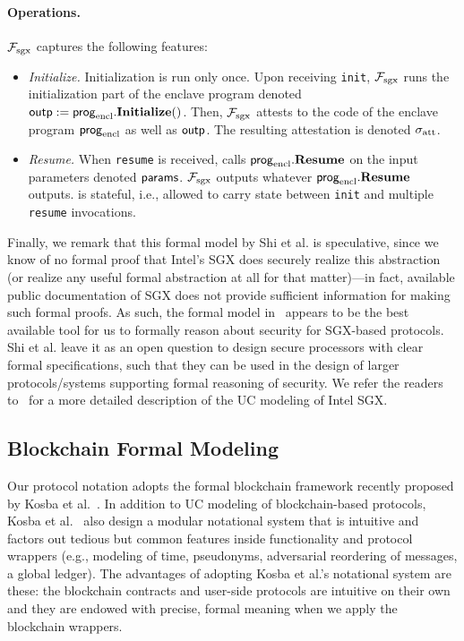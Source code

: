 \paragraph{Operations.}
$\mathcal{F}_{\textrm{sgx}}$ captures the following features:
\begin{itemize}[leftmargin=5mm]
\item
{\it Initialize.}
Initialization is run only once.
Upon receiving \texttt{init}, $\mathcal{F}_{\textrm{sgx}}$
runs the initialization part of the enclave program
denoted ${\sf outp} := {\sf prog}_{\textrm{encl}}.{\bf Initialize}()$.
Then, $\mathcal{F}_{\textrm{sgx}}$ 
attests to the code of the enclave program ${\sf prog}_{\textrm{encl}}$ 
as well as ${\sf outp}$.
The resulting attestation is denoted 
${\sigma_{\textrm{att}}}$.
\item
{\it Resume.}
When \texttt{resume} is received,
\fsgx 
calls ${\sf prog}_{\textrm{encl}}.{\bf Resume}$
on the input parameters denoted ${\sf params}$.
$\mathcal{F}_{\textrm{sgx}}$ 
outputs whatever ${\sf prog}_{\textrm{encl}}.{\bf Resume}$ outputs.
\fsgx is stateful, i.e., allowed to carry state
between \texttt{init} and multiple \texttt{resume}
invocations.
\end{itemize}

Finally, we remark that this formal model by Shi et al.
is speculative,   
since we know of no formal
proof that Intel's SGX does securely realize this abstraction (or 
realize any useful formal
abstraction at all for that matter)---in fact, available public documentation of SGX
does not provide sufficient information for making such formal proofs. 
As such, the formal model in~\cite{sgxsok}  
appears to be the best available tool for us to 
formally reason about 
security 
for SGX-based protocols. 
Shi et al. leave it as an open question to design secure processors
with clear formal specifications, such that 
they can be used in the design of larger protocols/systems 
supporting formal reasoning of security.
We refer the readers to~\cite{sgxsok} 
for a more detailed description of the UC modeling of Intel SGX.


\subsection{Blockchain Formal Modeling}
\label{sec:blockchainmodel}

Our protocol notation adopts the formal blockchain
framework recently proposed by Kosba et al.~\cite{hawk}.
In addition to UC modeling of blockchain-based protocols, 
Kosba et al.~\cite{hawk} also 
design a modular notational system  
that is intuitive and factors out tedious but common   
features inside functionality and protocol wrappers (e.g.,
modeling of time, pseudonyms, adversarial reordering of messages, 
a global ledger).
The advantages of 
adopting Kosba et al.'s notational system are these:
the 
blockchain contracts and user-side protocols
are intuitive on their own and
they are endowed with precise, formal meaning
when  we apply the blockchain wrappers.

